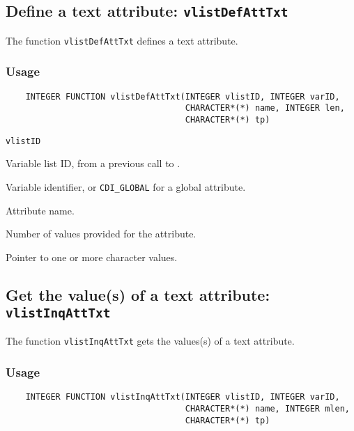 \subsection{Define a text attribute: {\tt vlistDefAttTxt}}
\label{vlistDefAttTxt}

The function {\tt vlistDefAttTxt} defines a text attribute.

\subsubsection*{Usage}

\begin{verbatim}
    INTEGER FUNCTION vlistDefAttTxt(INTEGER vlistID, INTEGER varID, 
                                    CHARACTER*(*) name, INTEGER len, 
                                    CHARACTER*(*) tp)
\end{verbatim}

\hspace*{4mm}\begin{minipage}[]{15cm}
\begin{deflist}{\tt vlistID\ }
\item[{\tt vlistID}]
Variable list ID, from a previous call to {}.
\item[{\tt varID}]
Variable identifier, or {\tt CDI\_GLOBAL} for a global attribute.
\item[{\tt name}]
Attribute name.
\item[{\tt len}]
Number of values provided for the attribute.
\item[{\tt tp}]
Pointer to one or more character values.

\end{deflist}
\end{minipage}


\subsection{Get the value(s) of a text attribute: {\tt vlistInqAttTxt}}
\label{vlistInqAttTxt}

The function {\tt vlistInqAttTxt} gets the values(s) of a text attribute.

\subsubsection*{Usage}

\begin{verbatim}
    INTEGER FUNCTION vlistInqAttTxt(INTEGER vlistID, INTEGER varID, 
                                    CHARACTER*(*) name, INTEGER mlen, 
                                    CHARACTER*(*) tp)
\end{verbatim}

